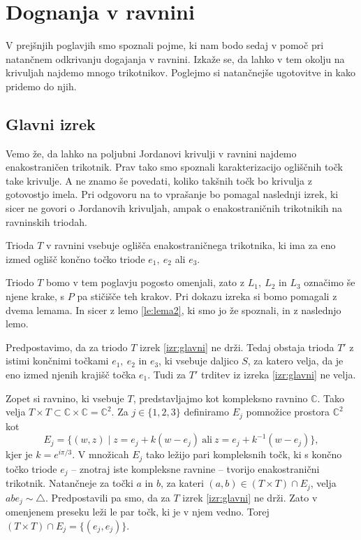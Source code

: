 \documentclass[mat1]{fmfdelo}
\newcommand{\C}{\mathbb C}
\begin{document}
\section{Dognanja v ravnini}
V prejšnjih poglavjih smo spoznali pojme, ki nam bodo sedaj v pomoč pri na\-tančnem odkrivanju dogajanja v ravnini. Izkaže se, da lahko v tem okolju na krivuljah najdemo mnogo trikotnikov. Poglejmo si natančnejše ugotovitve in kako pridemo do njih.
\subsection{Glavni izrek} 
Vemo že, da lahko na poljubni Jordanovi krivulji v ravnini najdemo enakostraničen trikotnik. Prav tako smo spoznali karakterizacijo ogliščnih točk take krivulje. A ne znamo še povedati, koliko takšnih točk bo krivulja z gotovostjo imela. Pri odgovoru na to vprašanje bo pomagal naslednji izrek, ki sicer ne govori o Jordanovih krivuljah, ampak o enakostraničnih trikotnikih na ravninskih triodah.
\begin{izrek}\label{izr:glavni}
Trioda $T$  v ravnini vsebuje oglišča enakostraničnega trikotnika, ki ima za eno izmed oglišč končno točko triode $e_1,\ e_2$ ali $e_3$.
\end{izrek}
Triodo $T$ bomo v tem poglavju pogosto omenjali, zato z $L_1,\ L_2$ in $L_3$ označimo še njene krake, s $P$ pa stičišče teh krakov. Pri dokazu izreka si bomo pomagali z dvema lemama. In sicer z lemo \ref{le:lema2}, ki smo jo že spoznali, in z naslednjo lemo.
\begin{lema}\label{le:protislovje}
Predpostavimo, da za triodo $T$ izrek \ref{izr:glavni} ne drži. Tedaj obstaja trioda $T'$ z istimi končnimi točkami $e_1,\ e_2$ in $e_3$, ki vsebuje daljico $S$, za katero velja, da je eno izmed njenih krajišč točka $e_1$. Tudi za $T'$ trditev iz izreka \ref{izr:glavni} ne velja.
\end{lema}

\proof
Zopet si ravnino, ki vsebuje $T$, predstavljajmo kot kompleksno ravnino $\C$. Tako velja $T \times T \subset \C \times \C = \C^2$. Za $j \in \{1, 2, 3\}$ definiramo $E_j$ pomnožice prostora $\C^2$ kot
\[
E_j = \{(w, z) \mid z = e_j + k(w-e_j)\ \text{ali}\ z = e_j + k^{-1}(w-e_j)\},
\]
kjer je $k = e^{i\pi / 3}$. V množicah $E_j$ tako ležijo pari kompleksnih točk, ki s končno točko triode $e_j$ -- znotraj iste kompleksne ravnine -- tvorijo enakostranični trikotnik. Natančneje za točki $a$ in $b$, za kateri $(a, b) \in (T \times T) \cap E_j$, velja $abe_j \sim \triangle$. Predpostavili pa smo, da za $T$ izrek \ref{izr:glavni} ne drži. Zato v omenjenem preseku leži le par točk, ki je v njem vedno. Torej $(T \times T) \cap E_j = \{(e_j, e_j)\}$.
\end{document}
